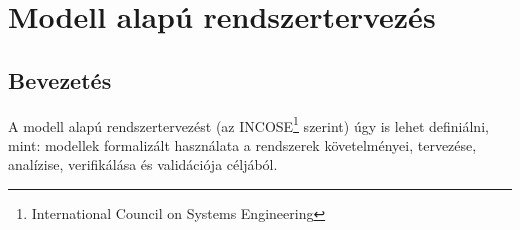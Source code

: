 \chapter{Modell alapú rendszertervezés}
\label{sec:ModelBasedTesting}
\section{Bevezetés}

A modell alapú rendszertervezést (az INCOSE\footnote{International Council on Systems Engineering} szerint) úgy is lehet definiálni, mint: modellek formalizált használata a rendszerek követelményei, tervezése, analízise, verifikálása és validációja céljából. \cite{mbse_wiki}

